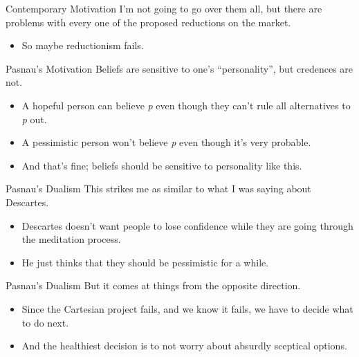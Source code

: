 \documentclass[
  17pt,
  letterpaper,
  ignorenonframetext,
  aspectratio=169,
  handout]{beamer}
\providecommand{\tightlist}{%
  \setlength{\itemsep}{0pt}\setlength{\parskip}{0pt}}\usepackage{longtable,booktabs,array}
\begin{document}
\begin{frame}{Contemporary Motivation}
\protect\hypertarget{contemporary-motivation-1}{}
I'm not going to go over them all, but there are problems with every one
of the proposed reductions on the market.

\begin{itemize}[<+->]
\tightlist
\item
  So maybe reductionism fails.
\end{itemize}
\end{frame}

\begin{frame}{Pasnau's Motivation}
\protect\hypertarget{pasnaus-motivation}{}
Beliefs are sensitive to one's ``personality'', but credences are not.

\begin{itemize}[<+->]
\tightlist
\item
  A hopeful person can believe \emph{p} even though they can't rule all
  alternatives to \emph{p} out.
\item
  A pessimistic person won't believe \emph{p} even though it's very
  probable.
\item
  And that's fine; beliefs should be sensitive to personality like this.
\end{itemize}
\end{frame}

\begin{frame}{Pasnau's Dualism}
\protect\hypertarget{pasnaus-dualism}{}
This strikes me as similar to what I was saying about Descartes.

\begin{itemize}[<+->]
\tightlist
\item
  Descartes doesn't want people to lose confidence while they are going
  through the meditation process.
\item
  He just thinks that they should be pessimistic for a while.
\end{itemize}
\end{frame}

\begin{frame}{Pasnau's Dualism}
\protect\hypertarget{pasnaus-dualism-1}{}
But it comes at things from the opposite direction.

\begin{itemize}[<+->]
\tightlist
\item
  Since the Cartesian project fails, and we know it fails, we have to
  decide what to do next.
\item
  And the healthiest decision is to not worry about absurdly sceptical
  options.
\end{itemize}
\end{frame}
\end{document}
